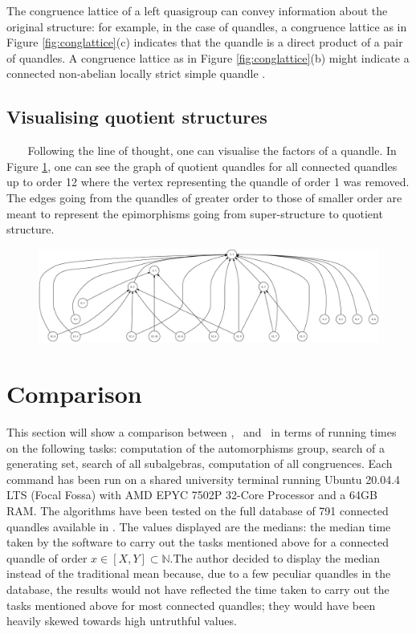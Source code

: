 \documentclass{mcom-l}
\begin{document}
\noindent The congruence lattice of a left quasigroup can convey information about the original structure: for example, in the case of quandles, a congruence lattice as in Figure \ref{fig:conglattice}(c) indicates that the quandle is a direct product of a pair of quandles. A congruence lattice as in Figure \ref{fig:conglattice}(b) might indicate a connected non-abelian locally strict simple quandle \cite{bonatto2022connected}.

\subsection{Visualising quotient structures}\textcolor{white}{line}\newline
\noindent Following the line of thought, one can visualise the factors of a quandle. \newline In Figure \ref{fig:qquandle}, one can see the graph of quotient quandles for all connected quandles up to order 12 where the vertex representing the quandle of order 1 was removed. The edges going from the quandles of greater order to those of smaller order are meant to represent the epimorphisms going from super-structure to quotient structure.
\begin{figure}[H]
    \centering
    \includegraphics[scale = 0.25]{Thesis/images/BigConnectedQuoQuandle.eps}
    \caption{}
    \label{fig:qquandle}
\end{figure}
\section{Comparison}
\noindent This section will show a comparison between \Software, \rig~and \cream~in terms of running times on the following tasks:  computation of the automorphisms group, search of a generating set, search of all subalgebras, computation of all congruences.
Each command has been run on a shared university terminal running Ubuntu 20.04.4 LTS (Focal Fossa) with AMD EPYC 7502P 32-Core Processor and a 64GB RAM. The algorithms have been tested on the full database of 791 connected quandles available in \rig. The values displayed are the medians: the median time taken by the software to carry out the tasks mentioned above for a connected quandle of order $x\in [X,Y]\subset \mathbb{N}$.\newline The author decided to display the median instead of the traditional mean because, due to a few peculiar quandles in the database, the results would not have reflected the time taken to carry out the tasks mentioned above for most connected quandles; they would have been heavily skewed towards high untruthful values. 
\end{document}
